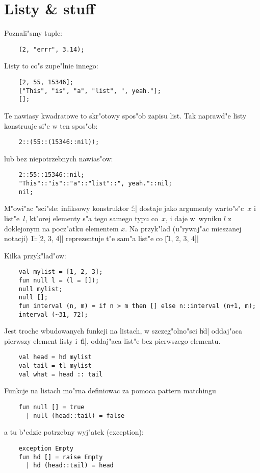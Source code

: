 \chapter{
Listy \& stuff
}

Poznali"smy tuple: 
\begin{verbatim}
    (2, "errr", 3.14);
\end{verbatim}
Listy to co"s zupe"lnie innego:
\begin{verbatim}
    [2, 55, 15346];
    ["This", "is", "a", "list", ", yeah."];
    [];
\end{verbatim}

Te nawiasy kwadratowe to skr"otowy spos"ob zapisu list.
Tak naprawd"e listy konstruuje si"e w ten spos"ob:
\begin{verbatim}
    2::(55::(15346::nil));
\end{verbatim}
lub bez niepotrzebnych nawias"ow:
\begin{verbatim}
    2::55::15346::nil;
    "This"::"is"::"a"::"list"::", yeah."::nil;
    nil;
\end{verbatim}

M"owi"ac "sci"sle: infiksowy konstruktor \|::| dostaje jako argumenty
warto"s"c~$x$ i list"e~$l$, kt"orej elementy s"a tego samego typu co~$x$,
i daje w~wyniku $l$ z doklejonym na pocz"atku elementem $x$.
Na przyk"lad (u"rywaj"ac mieszanej notacji) \|1::[2, 3, 4]| 
reprezentuje t"e sam"a list"e co  \|[1, 2, 3, 4]|

Kilka przyk"lad"ow:
\begin{verbatim}
    val mylist = [1, 2, 3];
    fun null l = (l = []);
    null mylist;
    null [];
    fun interval (n, m) = if n > m then [] else n::interval (n+1, m);
    interval (~31, 72);
\end{verbatim}

Jest troche wbudowanych funkcji na listach,
w szczeg"olno"sci
\|hd| oddaj"aca pierwszy element listy i~\|tl|, oddaj"aca list"e bez pierwszego elementu.
\begin{verbatim}
    val head = hd mylist
    val tail = tl mylist
    val what = head :: tail
\end{verbatim}

Funkcje na listach mo"rna definiowac za pomoca pattern matchingu
\begin{verbatim}
    fun null [] = true
      | null (head::tail) = false
\end{verbatim}
a tu b"edzie potrzebny wyj"atek (exception):
\begin{verbatim}
    exception Empty
    fun hd [] = raise Empty
      | hd (head::tail) = head
\end{verbatim}

